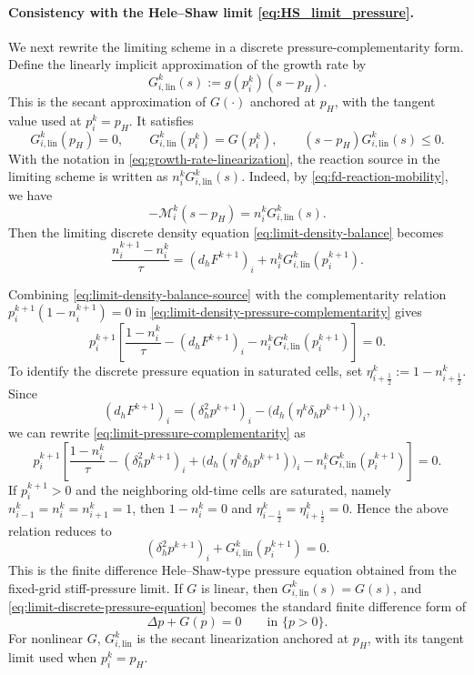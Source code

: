 \documentclass[11pt]{article}
\theoremstyle{plain}
\numberwithin{equation}{section}
\begin{document}
\paragraph{Consistency with the Hele--Shaw limit \eqref{eq:HS_limit_pressure}.}
We next rewrite the limiting scheme in a discrete pressure-complementarity
form. Define the linearly implicit approximation of the growth rate by
\begin{equation}
G_{i,\mathrm{lin}}^k(s)
:=
g(p_i^k)(s-p_H).
\label{eq:growth-rate-linearization}
\end{equation}
This is the secant approximation of \(G(\cdot)\) anchored at \(p_H\), with
the tangent value used at \(p_i^k=p_H\). It satisfies
\[
G_{i,\mathrm{lin}}^k(p_H)=0,\qquad
G_{i,\mathrm{lin}}^k(p_i^k)=G(p_i^k),\qquad
(s-p_H)G_{i,\mathrm{lin}}^k(s)\le0 .
\]
With the notation in \eqref{eq:growth-rate-linearization}, the reaction
source in the limiting scheme is written as
\(n_i^kG_{i,\mathrm{lin}}^k(s)\). Indeed, by \eqref{eq:fd-reaction-mobility}, we have
\[
-\mathcal M_i^k(s-p_H)
=
n_i^kG_{i,\mathrm{lin}}^k(s).
\]
Then the limiting discrete density equation \eqref{eq:limit-density-balance}
becomes
\begin{equation}
\frac{n_i^{k+1}-n_i^k}{\tau}
=
(d_hF^{k+1})_i
+
n_i^kG_{i,\mathrm{lin}}^k(p_i^{k+1}).
\label{eq:limit-density-balance-source}
\end{equation}

Combining \eqref{eq:limit-density-balance-source} with the complementarity relation
\(p_i^{k+1}(1-n_i^{k+1})=0\) in \eqref{eq:limit-density-pressure-complementarity} gives 
\begin{equation}
p_i^{k+1}
\left[
\frac{1-n_i^k}{\tau}
-
(d_hF^{k+1})_i
-
n_i^kG_{i,\mathrm{lin}}^k(p_i^{k+1})
\right]
=0.
\label{eq:limit-pressure-complementarity}
\end{equation}
To identify the discrete pressure equation in saturated cells, set
\(\eta_{i+\frac12}^k:=1-n_{i+\frac12}^k\). 
Since
\[
(d_hF^{k+1})_i
=
(\delta_h^2p^{k+1})_i
-
\bigl(d_h(\eta^k\delta_hp^{k+1})\bigr)_i,
\]
we can rewrite
\eqref{eq:limit-pressure-complementarity} as
\[
p_i^{k+1}
\left[
\frac{1-n_i^k}{\tau}
-
(\delta_h^2p^{k+1})_i
+
\bigl(d_h(\eta^k\delta_hp^{k+1})\bigr)_i
-
n_i^kG_{i,\mathrm{lin}}^k(p_i^{k+1})
\right]
=0.
\]
If \(p_i^{k+1}>0\) and the neighboring old-time cells are saturated, namely
\(n_{i-1}^k=n_i^k=n_{i+1}^k=1\), then \(1-n_i^k=0\) and
\(\eta_{i-\frac12}^k=\eta_{i+\frac12}^k=0\). Hence the above relation reduces
to
\begin{equation}
(\delta_h^2p^{k+1})_i
+
G_{i,\mathrm{lin}}^k(p_i^{k+1})
=
0.
\label{eq:limit-discrete-pressure-equation}
\end{equation}
This is the finite difference Hele--Shaw-type pressure equation obtained from
the fixed-grid stiff-pressure limit. If \(G\) is linear, then
\(G_{i,\mathrm{lin}}^k(s)=G(s)\), and
\eqref{eq:limit-discrete-pressure-equation} becomes the standard finite
difference form of
\[
\Delta p+G(p)=0
\qquad \text{in } \{p>0\}.
\]
For nonlinear \(G\), \(G_{i,\mathrm{lin}}^k\) is the secant linearization
anchored at \(p_H\), with its tangent limit used when \(p_i^k=p_H\).
\end{document}
